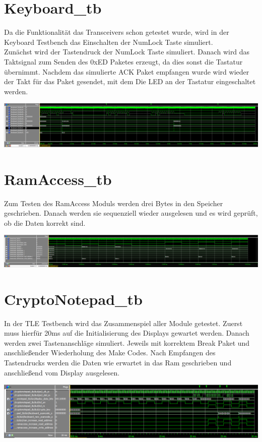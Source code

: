 \documentclass[a4paper,12pt]{report}
\begin{document}
	\section{Keyboard\_tb}
		Da die Funktionalität das Transceivers schon getestet wurde, wird in der Keyboard Testbench das Einschalten der NumLock Taste simuliert.\\
		Zunächst wird der Tastendruck der NumLock Taste simuliert. Danach wird das Taktsignal zum Senden des 0xED Paketes erzeugt, da dies sonst die Tastatur übernimmt. Nachdem das simulierte ACK  Paket empfangen wurde wird wieder der Takt für das Paket gesendet, mit dem Die LED an der Tastatur eingeschaltet werden.
		\begin{center}
			\includegraphics[width=1\textwidth]{assets/keyboard_tb}
		\end{center}
	
	
	\section{RamAccess\_tb}
		Zum Testen des RamAccess Moduls werden drei Bytes in den Speicher geschrieben. Danach werden sie sequenziell wieder ausgelesen und es wird geprüft, ob die Daten korrekt sind.
		\begin{center}
				\includegraphics[width=1\textwidth]{assets/ramaccess_tb}
		\end{center}

	\section{CryptoNotepad\_tb}
		In der TLE Testbench wird das Zusammenspiel aller Module getestet. Zuerst muss hierfür 20ms auf die Initialisierung des Displays gewartet werden. Danach werden zwei Tastenanschläge simuliert. Jeweils mit korrektem Break Paket und anschließender Wiederholung des Make Codes. 
		Nach Empfangen des Tastendrucks werden die Daten wie erwartet in das Ram geschrieben und anschließend vom Display ausgelesen.
		\begin{center}
			\includegraphics[width=1\textwidth]{assets/CryptoNotepad_tb}
		\end{center}
		
\end{document}
